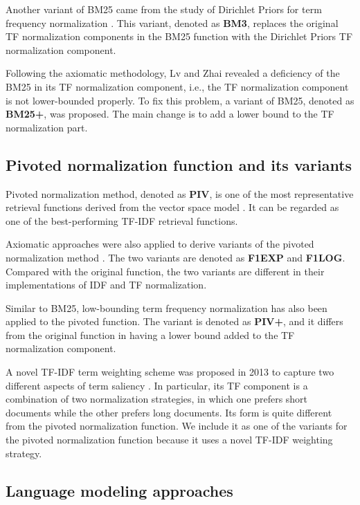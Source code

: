 Another variant of BM25 came from the study of 
Dirichlet Priors for term frequency normalization 
\cite{He:2005:SDP:1076034.1076114}. This variant, 
denoted as \textbf{BM3}, replaces the original TF normalization 
components in the BM25 function with the Dirichlet 
Priors TF normalization component. 

Following the axiomatic methodology, Lv and Zhai 
\cite{Lv:2011:LTF:2063576.2063584} revealed a deficiency of 
the BM25 in its TF normalization component, i.e., the TF
normalization component is not lower-bounded properly. 
To fix this problem, a variant of BM25, denoted as \textbf{BM25+}, 
was proposed. The main change is to add a lower bound to the 
TF normalization part. 

\subsection{Pivoted normalization function and its variants} 

Pivoted normalization method, denoted as \textbf{PIV}, is one of 
the most representative retrieval functions derived from the 
vector space model  \cite{Singhal:1996:PDL:243199.243206}. 
It can be regarded as one of the best-performing TF-IDF retrieval functions.  

Axiomatic approaches were also applied to derive variants of 
the pivoted normalization method \cite{Fang:2005:EAA:1076034.1076116}.
The two variants are denoted as \textbf{F1EXP} and \textbf{F1LOG}. 
Compared with the original function, the two variants are 
different in their implementations of IDF and TF normalization. 

Similar to BM25, low-bounding term frequency normalization has 
also been applied to the pivoted function.  The variant is denoted as 
\textbf{PIV+}, and it differs from the original function in 
having a lower bound added to the TF normalization component. 

A novel TF-IDF term weighting scheme was proposed in 2013 to 
capture two different aspects of term saliency 
\cite{Paik:2013:NTW:2484028.2484070}. In particular, its TF 
component is a combination of two normalization strategies, 
in which one prefers short documents while the other prefers
long documents. Its form is quite different from the pivoted 
normalization function. We include it as one of the variants
for the pivoted normalization function because it uses a 
novel TF-IDF weighting strategy. 

\subsection{Language modeling approaches}


